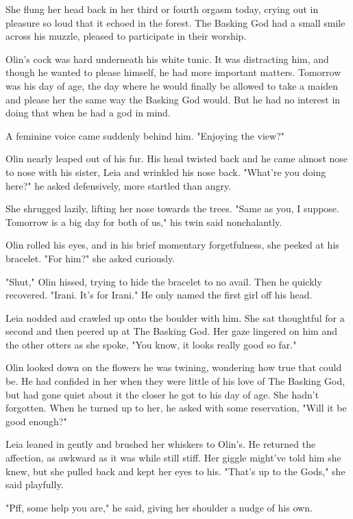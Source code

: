 She flung her head back in her third or fourth orgasm today, crying out in pleasure so loud that it echoed in the forest. The Basking God had a small smile across his muzzle, pleased to participate in their worship.

Olin's cock was hard underneath his white tunic. It was distracting him, and though he wanted to please himself, he had more important matters. Tomorrow was his day of age, the day where he would finally be allowed to take a maiden and please her the same way the Basking God would. But he had no interest in doing that when he had a god in mind.

A feminine voice came suddenly behind him. "Enjoying the view?"

Olin nearly leaped out of his fur. His head twisted back and he came almost nose to nose with his sister, Leia and wrinkled his nose back. "What're you doing here?" he asked defensively, more startled than angry.

She shrugged lazily, lifting her nose towards the trees. "Same as you, I suppose. Tomorrow is a big day for both of us," his twin said nonchalantly.

Olin rolled his eyes, and in his brief momentary forgetfulness, she peeked at his bracelet. "For him?" she asked curiously.

"Shut," Olin hissed, trying to hide the bracelet to no avail. Then he quickly recovered. "Irani. It's for Irani." He only named the first girl off his head.

Leia nodded and crawled up onto the boulder with him. She sat thoughtful for a second and then peered up at The Basking God. Her gaze lingered on him and the other otters as she spoke, "You know, it looks really good so far."

Olin looked down on the flowers he was twining, wondering how true that could be. He had confided in her when they were little of his love of The Basking God, but had gone quiet about it the closer he got to his day of age. She hadn't forgotten. When he turned up to her, he asked with some reservation, "Will it be good enough?"

Leia leaned in gently and brushed her whiskers to Olin's. He returned the affection, as awkward as it was while still stiff. Her giggle might've told him she knew, but she pulled back and kept her eyes to his. "That's up to the Gods," she said playfully.

"Pff, some help you are," he said, giving her shoulder a nudge of his own.

